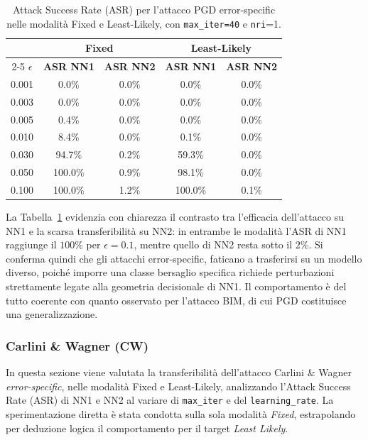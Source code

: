 \documentclass[a4paper, 12pt]{article}
\begin{document}
\begin{table}[H]
    \centering
    \vspace{0.2cm}
    \small
    \setlength{\tabcolsep}{8pt}
    \renewcommand{\arraystretch}{1.2}
    \begin{tabular}{| c | cc | cc |}
        \hline
        & \multicolumn{2}{c|}{\textbf{Fixed}}
        & \multicolumn{2}{c|}{\textbf{Least-Likely}} \\
        \cline{2-5}
        \textbf{$\epsilon$}
        & \textbf{ASR NN1} & \textbf{ASR NN2}
        & \textbf{ASR NN1} & \textbf{ASR NN2} \\
        \hline
        0.001 &   0.0\% & 0.0\% &   0.0\% & 0.0\% \\
        0.003 &   0.0\% & 0.0\% &   0.0\% & 0.0\% \\
        0.005 &   0.4\% & 0.0\% &   0.0\% & 0.0\% \\
        0.010 &   8.4\% & 0.0\% &   0.1\% & 0.0\% \\
        0.030 &  94.7\% & 0.2\% &  59.3\% & 0.0\% \\
        0.050 & 100.0\% & 0.9\% &  98.1\% & 0.0\% \\
        0.100 & 100.0\% & 1.2\% & 100.0\% & 0.1\% \\
        \hline
    \end{tabular}
    \caption{Attack Success Rate (ASR) per l'attacco PGD error-specific nelle 
    modalità Fixed e Least-Likely, con \texttt{max\_iter=40} e \texttt{nri}=1. }
    \label{tab:pgd_es_transferability}
\end{table}

La Tabella~\ref{tab:pgd_es_transferability} evidenzia con chiarezza il contrasto 
tra l'efficacia dell'attacco su NN1 e la scarsa transferibilità su NN2:
in entrambe le modalità l'ASR di NN1 raggiunge il $100\%$ per 
$\epsilon = 0.1$, mentre quello di NN2 resta sotto il $2\%$. Si conferma quindi 
che gli attacchi error-specific, faticano a trasferirsi su un modello diverso, 
poiché imporre una classe bersaglio specifica richiede perturbazioni strettamente legate alla geometria decisionale 
di NN1. Il comportamento è del tutto coerente con quanto osservato per l'attacco 
BIM, di cui PGD costituisce una generalizzazione.




\vspace{10pt}

\subsubsection{Carlini \& Wagner (CW)}
In questa sezione viene valutata la transferibilità dell'attacco Carlini \& Wagner 
\textit{error-specific}, nelle modalità Fixed e Least-Likely, analizzando l'Attack 
Success Rate (ASR) di NN1 e NN2 al variare di \texttt{max\_iter} e del 
\texttt{learning\_rate}.
La sperimentazione diretta è stata condotta sulla  sola modalità \textit{Fixed}, 
estrapolando per deduzione logica il comportamento per il target \textit{Least Likely}.
\end{document}
